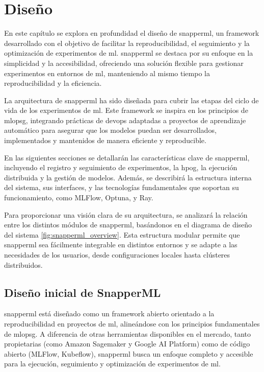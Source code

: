 \chapter{Diseño} \label{diseño}

En este capítulo se explora en profundidad el diseño de \Gls{snapperml}, un \gls{framework} desarrollado con el objetivo de facilitar la reproducibilidad, el seguimiento y la optimización de experimentos de \acrlong{ml}. \Gls{snapperml} se destaca por su enfoque en la simplicidad y la accesibilidad, ofreciendo una solución flexible para gestionar experimentos en entornos de \acrlong{ml}, manteniendo al mismo tiempo la reproducibilidad y la eficiencia.

La arquitectura de \Gls{snapperml} ha sido diseñada para cubrir las etapas del ciclo de vida de los experimentos de \acrlong{ml}. Este \gls{framework} se inspira en los principios de \Gls{mlopsg}, integrando prácticas de \Gls{devops} adaptadas a proyectos de aprendizaje automático para asegurar que los modelos puedan ser desarrollados, implementados y mantenidos de manera eficiente y reproducible.

En las siguientes secciones se detallarán las características clave de \Gls{snapperml}, incluyendo el registro y seguimiento de experimentos, la \Gls{hpog}, la ejecución distribuida y la gestión de modelos. Además, se describirá la estructura interna del sistema, sus interfaces, y las tecnologías fundamentales que soportan su funcionamiento, como MLFlow, Optuna, y Ray.

Para proporcionar una visión clara de su arquitectura, se analizará la relación entre los distintos módulos de \Gls{snapperml}, basándonos en el diagrama de diseño del sistema \ref{fig:snapperml_overview}. Esta estructura modular permite que \Gls{snapperml} sea fácilmente integrable en distintos entornos y se adapte a las necesidades de los usuarios, desde configuraciones locales hasta clústeres distribuidos.

\section{Diseño inicial de SnapperML}

\Gls{snapperml} está diseñado como un \gls{framework} abierto orientado a la reproducibilidad en proyectos de \acrlong{ml}, alineándose con los principios fundamentales de \Gls{mlopsg}. A diferencia de otras herramientas disponibles en el mercado, tanto propietarias (como Amazon Sagemaker y Google AI Platform) como de código abierto (MLFlow, Kubeflow), \Gls{snapperml} busca un enfoque completo y accesible para la ejecución, seguimiento y optimización de experimentos de \acrlong{ml}.


